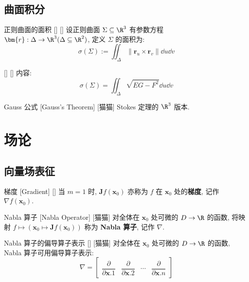 \documentclass[UTF8]{ctexart}
\begin{document}
		\subsection{曲面积分}

			\begin{dfn}
			    []
			    {正则曲面的面积}
			    []
			    []
				设正则曲面 \(\Sigma\subseteq\R^3\) 有参数方程 \(\bm{r}:\Delta\to\R^3(\Delta\subseteq\R^2)\), 定义 \(\Sigma\) 的面积为: 
				\[\sigma(\Sigma):=\iint_\Delta\|\bm{r}_u\times\bm{r}_v\|\dd u\dd v\]
			\end{dfn}

			\begin{thm}
				[]
				{}
				[]
				[]
				内容: 
				\[\sigma(\Sigma)=\iint_{\Delta}\sqrt{EG-F^2}\dd u\dd v\]
			\end{thm}
			
			\begin{thm}
				[]
				{Gauss 公式}
				[Gauss's Theorem]
				[猫猫]
				Stokes 定理的 \(\R^3\) 版本. 
			\end{thm}

	\section{场论}

		\subsection{向量场表征}

			\begin{dfn}
				[]
				{梯度}
				[Gradient]
				[]
				当 \(m=1\) 时, \(\bm{J}f(\bm{x}_0)\) 亦称为 \(f\) 在 \(\bm{x}_0\) 处的\textbf{梯度}, 记作 \(\nabla f(\bm{x}_0)\). 
			\end{dfn}
			
			\begin{dfn}
				[]
				{Nabla 算子}
				[Nabla Operator]
				[猫猫]
				对全体在 \(\bm{x}_0\) 处可微的 \(D\to\R\) 的函数, 将映射 \(f\mapsto(\bm{x}_0\mapsto\bm{J}f(\bm{x}_0))\) 称为 \textbf{Nabla 算子}, 记作 \(\nabla\). 
			\end{dfn}
			
			\begin{ppt}
				[]
				{Nabla 算子的偏导算子表示}
				[]
				[猫猫]
				对全体在 \(\bm{x}_0\) 处可微的 \(D\to\R\) 的函数, Nabla 算子可用偏导算子表示: 
				\[\nabla=
				\begin{bmatrix}
					\dfrac{\partial}{\partial \bm{x}.1} &
					\dfrac{\partial}{\partial \bm{x}.2} &
					\cdots &
					\dfrac{\partial}{\partial \bm{x}.n}
				\end{bmatrix}\]
			\end{ppt}
			
\end{document}
